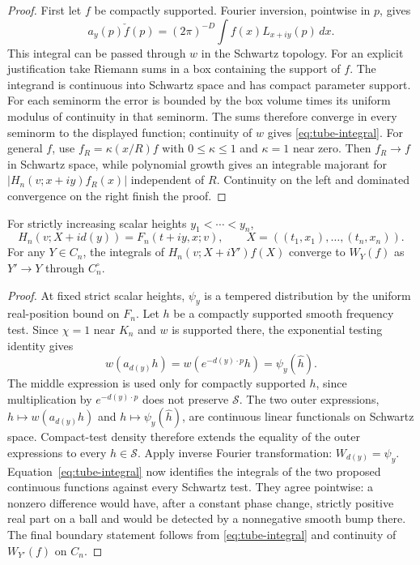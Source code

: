 \begin{proof}
First let $f$ be compactly supported. Fourier inversion, pointwise in $p$,
gives
\[
 a_y(p)\check f(p)
  =(2\pi)^{-D}\int f(x)L_{x+iy}(p)\,dx.
\]
This integral can be passed through $w$ in the Schwartz topology.
For an explicit justification take Riemann sums in a box containing the
support of $f$. The integrand is continuous into Schwartz space and has
compact parameter support. For each seminorm the error is bounded by
the box volume times its uniform modulus of continuity in that seminorm.
The sums therefore converge in every seminorm to the displayed function;
continuity of $w$ gives \eqref{eq:tube-integral}. For general $f$, use
$f_R=\kappa(x/R)f$ with $0\leq\kappa\leq1$ and $\kappa=1$ near zero.
Then $f_R\to f$ in Schwartz space, while polynomial growth gives an
integrable majorant for $|H_n(v;x+iy)f_R(x)|$ independent of $R$.
Continuity on the left and dominated convergence on the right finish
the proof.
\end{proof}

\begin{proposition}
\label{prop:tube-identification}
For strictly increasing scalar heights $y_1<\cdots<y_n$,
\[
 H_n(v;X+i d(y))=F_n(t+iy,x;v),
 \qquad X=((t_1,x_1),\ldots,(t_n,x_n)).
\]
For any $Y\in C_n$, the integrals of $H_n(v;X+iY')f(X)$ converge to
$W_Y(f)$ as $Y'\to Y$ through $C_n^\circ$.
\end{proposition}
\begin{proof}
At fixed strict scalar heights, $\psi_y$ is a tempered distribution by
the uniform real-position bound on $F_n$. Let $h$ be a compactly supported
smooth frequency test. Since $\chi=1$ near $K_n$ and $w$ is supported
there, the exponential testing identity gives
\[
 w(a_{d(y)}h)=w(e^{-d(y)\cdot p}h)
            =\psi_y(\widehat h).
\]
The middle expression is used only for compactly supported $h$, since
multiplication by $e^{-d(y)\cdot p}$ does not preserve $\mathscr S$. The two
outer expressions, $h\mapsto w(a_{d(y)}h)$ and $h\mapsto\psi_y(\widehat h)$,
are continuous linear functionals on Schwartz space. Compact-test density
therefore extends the equality of the outer expressions to every
$h\in\mathscr S$.
Apply inverse Fourier transformation: $W_{d(y)}=\psi_y$.
Equation~\eqref{eq:tube-integral} now identifies the integrals of the
two proposed continuous functions against every Schwartz test. They agree
pointwise: a nonzero difference would have, after a constant phase change,
strictly positive real part on a ball and would be detected by a
nonnegative smooth bump there. The final boundary statement follows from
\eqref{eq:tube-integral} and continuity of $W_{Y'}(f)$ on $C_n$.
\end{proof}

